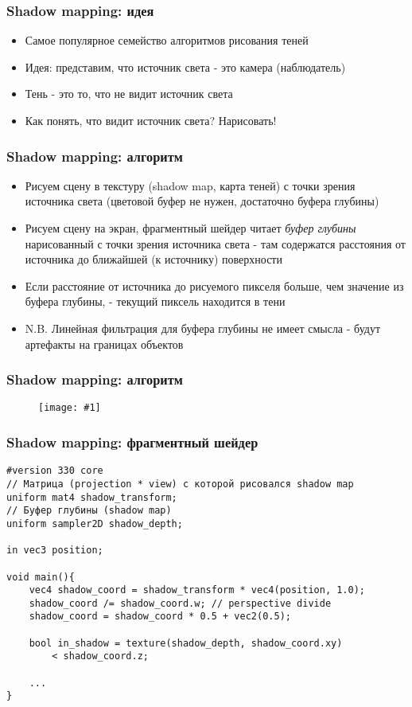\documentclass{beamer}
\newcommand{\slideimage}[1]{
  \begin{figure}
    \begin{adjustbox}{width=\textwidth, totalheight=\textheight-2\baselineskip-2\baselineskip,keepaspectratio}
      \texttt{[image: \#1]}
    \end{adjustbox}
  \end{figure}
}
\begin{document}
\begin{frame}[fragile]
\frametitle{Shadow mapping: идея}
\begin{itemize}
\item Самое популярное семейство алгоритмов рисования теней
\pause
\item Идея: представим, что источник света - это камера (наблюдатель)
\item Тень - это то, что не видит источник света
\pause
\item Как понять, что видит источник света? \pause Нарисовать!
\end{itemize}
\end{frame}

\begin{frame}[fragile]
\frametitle{Shadow mapping: алгоритм}
\begin{itemize}
\item Рисуем сцену в текстуру (shadow map, карта теней) с точки зрения источника света (цветовой буфер не нужен, достаточно буфера глубины)
\pause
\item Рисуем сцену на экран, фрагментный шейдер читает \textit{буфер глубины} нарисованный с точки зрения источника света - там содержатся расстояния от источника до ближайшей (к источнику) поверхности
\item Если расстояние от источника до рисуемого пикселя больше, чем значение из буфера глубины, - текущий пиксель находится в тени
\pause
\item N.B. Линейная фильтрация для буфера глубины не имеет смысла - будут артефакты на границах объектов
\end{itemize}
\end{frame}

\begin{frame}[fragile]
\frametitle{Shadow mapping: алгоритм}
\slideimage{shadow-mapping1.png}
\end{frame}

\begin{frame}[fragile]
\frametitle{Shadow mapping: фрагментный шейдер}
\fontsize{10pt}{10pt}
\begin{verbatim}
#version 330 core
// Матрица (projection * view) с которой рисовался shadow map
uniform mat4 shadow_transform;
// Буфер глубины (shadow map)
uniform sampler2D shadow_depth;

in vec3 position;

void main(){
    vec4 shadow_coord = shadow_transform * vec4(position, 1.0);
    shadow_coord /= shadow_coord.w; // perspective divide
    shadow_coord = shadow_coord * 0.5 + vec2(0.5);

    bool in_shadow = texture(shadow_depth, shadow_coord.xy)
        < shadow_coord.z;

    ...
}
\end{verbatim}
\end{frame}
\end{document}
